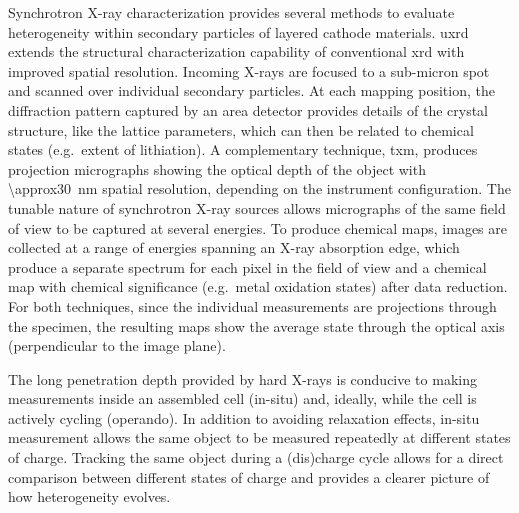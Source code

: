 \documentclass{article}
\begin{document}

Synchrotron X-ray characterization provides several methods to
evaluate heterogeneity within secondary particles of layered cathode
materials. \Gls{uxrd} extends the structural characterization
capability of conventional \gls{xrd} with improved spatial
resolution. Incoming X-rays are focused to a sub-micron spot and
scanned over individual secondary particles. At each mapping position,
the diffraction pattern captured by an area detector provides details
of the crystal structure, like the lattice parameters, which can then
be related to chemical states (e.g.\ extent of lithiation). A
complementary technique, \Gls{txm}, produces projection micrographs
showing the optical depth of the object with \SI{\approx30}{nm}
spatial resolution, depending on the instrument configuration. The
tunable nature of synchrotron X-ray sources allows micrographs of the
same field of view to be captured at several energies. To produce
chemical maps, images are collected at a range of energies spanning an
X-ray absorption edge, which produce a separate spectrum for each
pixel in the field of view and a chemical map with chemical
significance (e.g.\ metal oxidation states) after data reduction. For
both techniques, since the individual measurements are projections
through the specimen, the resulting maps show the average state
through the optical axis (perpendicular to the image plane).

The long penetration depth provided by hard X-rays is conducive to
making measurements inside an assembled cell (in-situ) and, ideally,
while the cell is actively cycling (operando). In addition to avoiding
relaxation effects, in-situ measurement allows the same object to be
measured repeatedly at different states of charge. Tracking the same
object during a (dis)charge cycle allows for a direct comparison
between different states of charge and provides a clearer picture of
how heterogeneity evolves.

\end{document}
